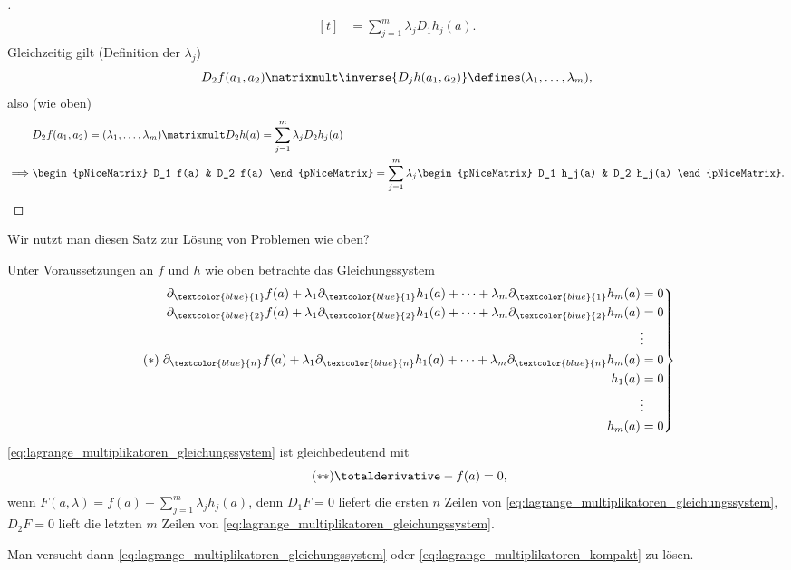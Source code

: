 \begin{proof}[]
\begin{align*}
\begin{aligned}[t]
      &=\sum_{j=1}^{m}\lambda_j D_1 h_j(a).
    \end{aligned}
  \end{align*}
  Gleichzeitig gilt (Definition der \( \lambda_j \))
  \begin{equation}
    D_2 f(a_1,a_2)\matrixmult\inverse{D_j h(a_1,a_2)}\defines (\lambda_1,\dotsc,\lambda_m),
  \end{equation}
  also (wie oben)
  \begin{align*}
    &D_2 f(a_1,a_2)=(\lambda_1,\dotsc,\lambda_m)\matrixmult D_2h(a)=\sum_{j=1}^{m}\lambda_j D_2 h_j(a)\\
    \implies &\begin{pNiceMatrix} D_1 f(a) & D_2 f(a) \end{pNiceMatrix}= \sum_{j=1}^{m} \lambda_j \begin{pNiceMatrix} D_1 h_j(a) & D_2 h_j(a) \end{pNiceMatrix}.
  \end{align*}
\end{proof}
Wir nutzt man diesen Satz zur Lösung von Problemen wie oben?
\begin{bemerkung}
  Unter Voraussetzungen an \( f \) und \( h \) wie oben betrachte das Gleichungssystem 
  \begin{gather}
    \tag{\( * \)}\label{eq:lagrange_multiplikatoren_gleichungssystem}\left.\begin{aligned}
      \partial_{\textcolor{blue}{1}}f(a)+\lambda_1\partial_{\textcolor{blue}{1}} h_1(a)+\dotsb+\lambda_m \partial_{\textcolor{blue}{1}} h_m(a)&=0\\
      \partial_{\textcolor{blue}{2}}f(a)+\lambda_1\partial_{\textcolor{blue}{2}} h_1(a)+\dotsb+\lambda_m \partial_{\textcolor{blue}{2}} h_m(a)&=0\\
      &\vdots\\
      \partial_{\textcolor{blue}{n}}f(a)+\lambda_1\partial_{\textcolor{blue}{n}} h_1(a)+\dotsb+\lambda_m \partial_{\textcolor{blue}{n}} h_m(a)&=0\\
      h_1(a)&=0\\
      &\vdots\\
      h_m(a)&=0
    \end{aligned}\right\}
  \end{gather}
  \eqref{eq:lagrange_multiplikatoren_gleichungssystem} ist gleichbedeutend mit
  \begin{equation*}
    \tag{\( ** \)} \label{eq:lagrange_multiplikatoren_kompakt}\totalderivative-{f}(a)=0,
  \end{equation*}
  wenn \( F(a,\lambda)=f(a)+\sum_{j=1}^{m}\lambda_j h_j(a) \), denn \( D_1 F=0 \) liefert die ersten \( n \) Zeilen von \eqref{eq:lagrange_multiplikatoren_gleichungssystem}, \( D_2 F=0 \) lieft die letzten \( m \) Zeilen von \eqref{eq:lagrange_multiplikatoren_gleichungssystem}.

  Man versucht dann \eqref{eq:lagrange_multiplikatoren_gleichungssystem} oder \eqref{eq:lagrange_multiplikatoren_kompakt} zu lösen.
\end{bemerkung}
